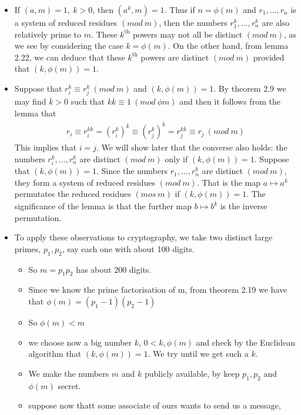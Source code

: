 \documentclass[a4paper]{article}
\begin{document}
\begin{itemize}
    \item If $(a,m)=1,\ k>0$, then $(a^k,m)=1$. Thus if $n=\phi(m)$ and
    $r_1,...,r_n$ is a system of reduced residues $(mod\ m)$, then the
    numbers $r_1^k,...,r_n^k$ are also relatively prime to $m$. These $k^\text{th}$
    powers may not all be distinct $(mod\ m)$, as we see by considering the case
    $k=\phi(m)$. On the other hand, from lemma 2.22, we can deduce that
    these $k^\text{th}$ powers are distinct $(mod\ m)$ provided that $(k,\phi(m))=1$.
    \item Suppose that $r_i^k\equiv r_j^k\ (mod\ m)$ and $(k,\phi(m))=1$.
    By theorem 2.9 we may find $\overline{k}>0$ such that
    $k\overline{k}\equiv 1\ (mod\ \phi{m})$ and then it follows from the lemma that
    \begin{align}
        r_i\equiv r_i^{k\overline{k}}=(r_i^k)^{\overline{k}}\equiv (r_j^k)^{\overline{k}}= r_j^{k\overline{k}}\equiv r_j\ (mod\ m)
    \end{align}
    This implies that $i=j$. We will show later that the converse also holds:
    the numbers $r_i^k,...,r_n^k$ are distinct $(mod\ m)$ only if $(k,\phi(m))=1$.
    Suppose that $(k,\phi(m))=1$. Since the numbers $r_1,...,r_n^k$ are distinct
    $(mod\ m)$, they form a system of reduced residues $(mod\ m)$. That is the map
    $a\mapsto a^k$ permutates the reduced residues $(mos\ m)$ if $(k,\phi(m))=1$.
    The significance of the lemma is that the further map $b\mapsto b^{\overline{k}}$
    is the inverse permutation.
    \item To apply these observations to cryptography, we take two distinct large
    primes, $p_1, p_2$, say each one with about 100 digits.
    \begin{itemize}
        \item So $m=p_1p_2$ has about 200 digits.
        \item Since we know the prime factorisation of m, from theorem 2.19
        we have that $\phi(m)=(p_1-1)(p_2-1)$
        \item So $\phi(m)<m$
        \item we choose now a big number $k$, $0<k,\phi(m)$ and check by the
        Euclidean algorithm that $(k,\phi(m))=1$. We try until we get such a $k$.
        \item We make the numbers $m$ and $k$ publicly available, by keep $p_1,p_2$
        and $\phi(m)$ secret.
        \item suppose now thatt some associate of ours wants to send us a message,

\end{itemize}
\end{itemize}
\end{document}
